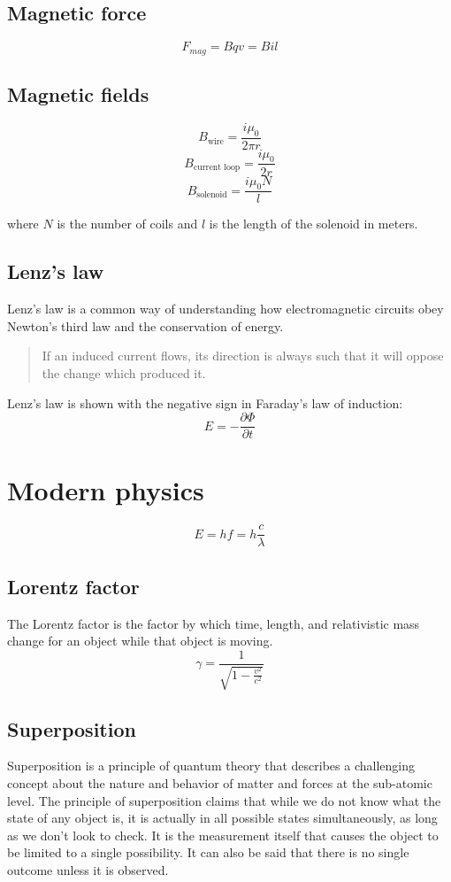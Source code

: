 \documentclass[12pt, oneside]{book}
\newcommand*\reciprocal[1]{\frac{1}{#1}}
\begin{document}
\section{Magnetic force}
\[F_{mag} = B q v = B i l\]

\section{Magnetic fields}
\[B_{\text{wire}} = \frac{i \mu_0}{2 \pi r}\]
\[B_{\text{current loop}} = \frac{i \mu_0}{2 r}\]
\[B_{\text{solenoid}} = \frac{i \mu_0 N}{l}\]

where \(N\) is the number of coils and \(l\) is the length of the solenoid in
meters.

\section{Lenz's law}
Lenz's law is a common way of understanding how electromagnetic circuits obey
Newton's third law and the conservation of energy.
\begin{quote}
If an induced current flows, its direction is always such that it will oppose
the change which produced it.
\end{quote}
Lenz's law is shown with the negative sign in Faraday's law of induction:
\[{E}=-\frac{\partial \Phi}{\partial t}\]

\chapter{Modern physics}
\[E = hf = h\frac{c}{\lambda}\]

\section{Lorentz factor}
The Lorentz factor is the factor by which time, length, and relativistic mass
change for an object while that object is moving.
\[\gamma = \reciprocal{\sqrt{1 - \frac{v^2}{c^2}}}\]

\section{Superposition}
Superposition is a principle of quantum theory that describes a challenging
concept about the nature and behavior of matter and forces at the sub-atomic
level. The principle of superposition claims that while we do not know what the
state of any object is, it is actually in all possible states simultaneously,
as long as we don't look to check. It is the measurement itself that causes the
object to be limited to a single possibility. It can also be said that there is
no single outcome unless it is observed.
\end{document}

